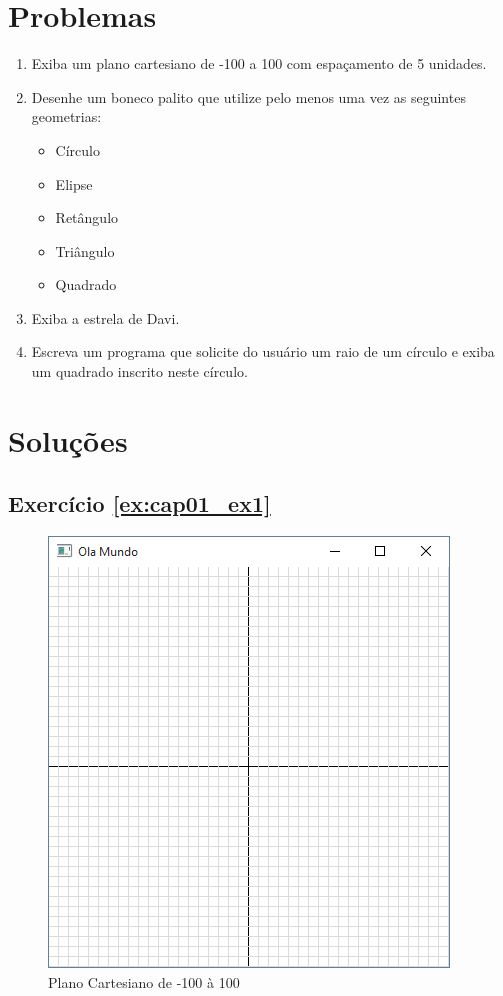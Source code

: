 \section*{Problemas}
\begin{enumerate}
\item
  Exiba um plano cartesiano de -100 a 100 com espaçamento de 5 unidades.
  \label{ex:cap01_ex1}

\item
  Desenhe um boneco palito que utilize pelo menos uma vez as seguintes geometrias:
  \begin{itemize}
  \item
    Círculo
  \item
    Elipse
  \item
    Retângulo
  \item
    Triângulo
  \item
    Quadrado
  \end{itemize}
  \label{ex:cap01_ex2}

\item
  Exiba a estrela de Davi.
  \label{ex:cap01_ex3}

\item
  Escreva um programa que solicite do usuário um raio de um círculo e exiba um quadrado inscrito neste círculo.
  \label{ex:cap01_ex8}


\end{enumerate}


\section*{Soluções}

\subsection*{Exercício \ref{ex:cap01_ex1}}
\begin{figure}[ht]
  \centerline{\includegraphics[width=.5\textwidth]{img/cap1_ex1.png}}
  \caption{Plano Cartesiano de -100 à 100}
  \label{fig:cap01_ex1}
\end{figure}

